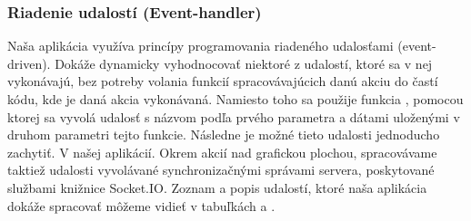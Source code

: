 \subsubsection{Riadenie udalostí (Event-handler)}
Naša aplikácia využíva princípy programovania riadeného udalosťami (event-driven). Dokáže dynamicky vyhodnocovať niektoré z udalostí, ktoré sa v nej vykonávajú, bez potreby volania funkcií spracovávajúcich danú akciu do častí kódu, kde je daná akcia vykonávaná. Namiesto toho sa použije funkcia , pomocou ktorej sa vyvolá udalosť s názvom podľa prvého parametra a dátami uloženými v druhom parametri tejto funkcie. Následne je možné tieto udalosti jednoducho zachytiť. V našej aplikácií. 
Okrem akcií nad grafickou plochou, spracovávame taktiež udalosti vyvolávané synchronizačnými správami servera, poskytované službami knižnice Socket.IO. Zoznam a popis udalostí, ktoré naša aplikácia dokáže spracovať môžeme vidieť v tabuľkách  a .

